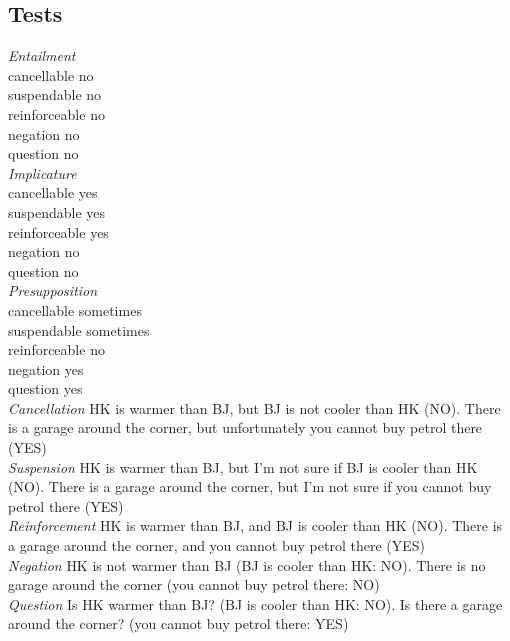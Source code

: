 \subsection*{Tests}
\emph{Entailment}\\
cancellable no\\
suspendable no\\
reinforceable no\\
negation no\\
question no\\
\emph{Implicature}\\
cancellable yes\\
suspendable yes\\
reinforceable yes\\
negation no\\
question no\\
\emph{Presupposition}\\
cancellable sometimes\\
suspendable sometimes\\
reinforceable no\\
negation yes\\
question yes\\
\emph{Cancellation} {\tiny HK is warmer than BJ, but BJ is not cooler than HK (NO). There is a garage around the corner, but unfortunately you cannot buy petrol there (YES)}\\
\emph{Suspension} {\tiny HK is warmer than BJ, but I'm not sure if BJ is cooler than HK (NO). There is a garage around the corner, but I'm not sure if you cannot buy petrol there (YES)}\\
\emph{Reinforcement} {\tiny HK is warmer than BJ, and BJ is cooler than HK (NO). There is a garage around the corner, and you cannot buy petrol there (YES)}\\
\emph{Negation} {\tiny HK is not warmer than BJ (BJ is cooler than HK: NO). There is no garage around the corner (you cannot buy petrol there: NO)}\\
\emph{Question} {\tiny Is HK warmer than BJ? (BJ is cooler than HK: NO). Is there a garage around the corner? (you cannot buy petrol there: YES)}\\